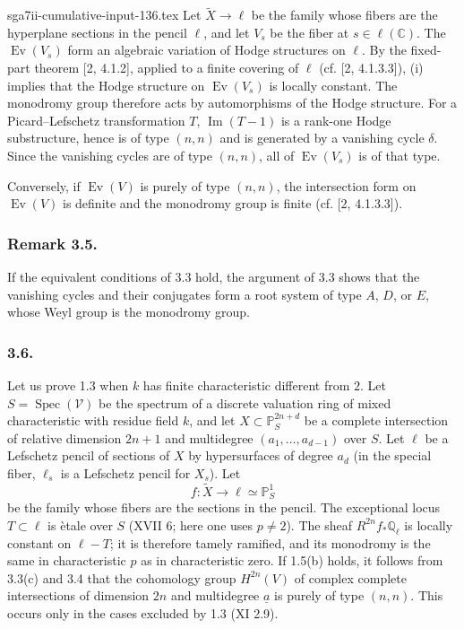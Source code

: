 \begin{filecontents*}{sga7ii-cumulative-input-136.tex}
Let $\widetilde X\to\ell$ be the family whose fibers are the hyperplane
sections in the pencil $\ell$, and let $V_s$ be the fiber at
$s\in\ell(\mathbb C)$.  The $\operatorname{Ev}(V_s)$ form an algebraic
variation of Hodge structures on $\ell$.  By the fixed-part theorem
[2, 4.1.2], applied to a finite covering of $\ell$ (cf. [2, 4.1.3.3]), (i)
implies that the Hodge structure on $\operatorname{Ev}(V_s)$ is locally
constant.  The monodromy group therefore acts by automorphisms of the Hodge
structure.  For a Picard--Lefschetz transformation $T$,
$\operatorname{Im}(T-1)$ is a rank-one Hodge substructure, hence is of type
$(n,n)$ and is generated by a vanishing cycle $\delta$.  Since the
vanishing cycles are of type $(n,n)$, all of
$\operatorname{Ev}(V_s)$ is of that type.

Conversely, if $\operatorname{Ev}(V)$ is purely of type $(n,n)$, the
intersection form on $\operatorname{Ev}(V)$ is definite and the monodromy
group is finite (cf. [2, 4.1.3.3]).

\subsubsection*{Remark 3.5.}
If the equivalent conditions of 3.3 hold, the argument of 3.3 shows that
the vanishing cycles and their conjugates form a root system of type $A$,
$D$, or $E$, whose Weyl group is the monodromy group.

\subsubsection*{3.6.}
Let us prove 1.3 when $k$ has finite characteristic different from $2$.
Let $S=\operatorname{Spec}(\mathcal V)$ be the spectrum of a discrete
valuation ring of mixed characteristic with residue field $k$, and let
$X\subset\mathbb P_S^{2n+d}$ be a complete intersection of relative
dimension $2n+1$ and multidegree $(a_1,\ldots,a_{d-1})$ over $S$.  Let
$\ell$ be a Lefschetz pencil of sections of $X$ by hypersurfaces of degree
$a_d$ (in the special fiber, $\ell_s$ is a Lefschetz pencil for $X_s$).
Let
\[
  f:\widetilde X\longrightarrow\ell\simeq\mathbb P^1_S
\]
be the family whose fibers are the sections in the pencil.  The exceptional
locus $T\subset\ell$ is \`etale over $S$ (XVII 6; here one uses
$p\ne2$).  The sheaf $R^{2n}f_*\mathbb Q_\ell$ is locally constant on
$\ell-T$; it is therefore tamely ramified, and its monodromy is the same in
characteristic $p$ as in characteristic zero.  If 1.5(b) holds, it follows
from 3.3(c) and 3.4 that the cohomology group $H^{2n}(V)$ of complex
complete intersections of dimension $2n$ and multidegree
$\underline a$ is purely of type $(n,n)$.  This occurs only in the cases
excluded by 1.3 (XI 2.9).

\end{filecontents*}
